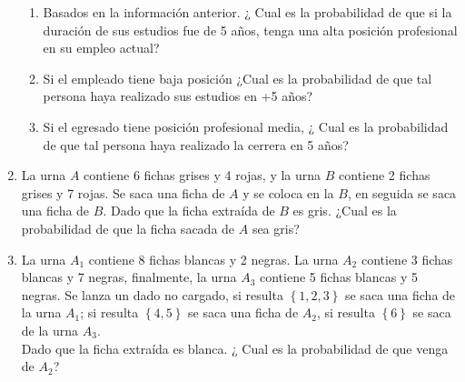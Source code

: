 \begin{enumerate}
\begin{center}
\end{center}
\begin{enumerate}
\item Basados en la información anterior.  ¿ Cual es la probabilidad de que si la duración de sus estudios fue de 5 años, tenga una alta posición profesional en su empleo actual?
\item Si el empleado tiene baja posición ¿Cual es la probabilidad de que tal persona haya realizado sus estudios en +5 años?
\item Si el egresado tiene posición profesional media, ¿ Cual es la probabilidad de que tal persona haya realizado la cerrera en 5 años?
\end{enumerate}
\item La urna $A$ contiene 6 fichas grises y 4 rojas, y la urna $B$ contiene 2 fichas grises y 7 rojas. Se saca una ficha de $A$ y se coloca en la $B$, en seguida se saca una ficha de $B$. Dado que la ficha extraída de $B$ es gris. ¿Cual es la probabilidad de que la ficha sacada de $A$ sea gris?
\item La urna $A_1$ contiene 8 fichas blancas y 2 negras. La urna $A_2$ contiene 3 fichas blancas y 7 negras, finalmente, la urna $A_3$ contiene 5 fichas blancas y 5 negras. Se lanza un dado no cargado, si resulta $\left\lbrace 1,2,3\right\rbrace $ se saca una ficha de la urna $A_1$; si resulta $\left\lbrace 4,5 \right\rbrace $ se saca una ficha de $A_2$, si resulta $\left\lbrace 6 \right\rbrace $ se saca de la urna $A_3$. \\${ }$\\ Dado que la ficha extraída es blanca. ¿ Cual es la probabilidad de que venga de $A_2$?
\end{enumerate}

